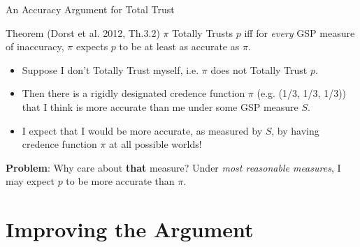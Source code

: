 \documentclass[aspectratio=169, dvipsnames]{beamer}
\newcommand{\E}{\mathbb{E}}
\begin{document}

\begin{frame}{An Accuracy Argument for Total Trust}
  \begin{block}{Theorem (Dorst et al. 2012, Th.3.2)}
    $\pi$ Totally Trusts $p$ iff for \textit{every} GSP measure of inaccuracy, $\pi$ expects $p$ to be at least as accurate
    as $\pi$. 
  \end{block}
  \begin{itemize}
  \item Suppose I don't Totally Trust myself, i.e. $\pi$ does not Totally Trust $p$.
  \item Then there is a rigidly designated credence function $\pi$ (e.g. (1/3, 1/3, 1/3)) that I think is more accurate
    than me under some GSP measure $S$.
  \item I expect that I would be more accurate, as measured by $S$, by having credence function $\pi$ at all possible worlds!
  \end{itemize}

  \textbf{Problem}: Why care about \alert{\textbf{that}} measure? Under \textit{most reasonable measures}, I may
  expect $p$ to be more accurate than $\pi$.
\end{frame}


\section{Improving the Argument}
\end{document}
